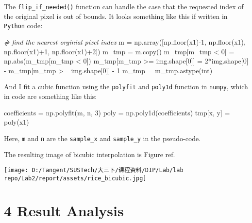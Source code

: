 \documentclass[
]{article}
\newenvironment{Shaded}{}{}
\newcommand{\BuiltInTok}[1]{\textcolor[rgb]{0.00,0.50,0.00}{#1}}
\newcommand{\CommentTok}[1]{\textcolor[rgb]{0.38,0.63,0.69}{\textit{#1}}}
\newcommand{\DecValTok}[1]{\textcolor[rgb]{0.25,0.63,0.44}{#1}}
\newcommand{\NormalTok}[1]{#1}
\newcommand{\OperatorTok}[1]{\textcolor[rgb]{0.40,0.40,0.40}{#1}}
\begin{document}
The \texttt{flip\_if\_needed()} function can handle the case that the
requested index of the original pixel is out of bounds. It looks
something like this if written in \texttt{Python} code:

\begin{Shaded}
\begin{Highlighting}[]
\CommentTok{\# find the nearest orginial pixel index}
\NormalTok{m }\OperatorTok{=}\NormalTok{ np.array([np.floor(x1)}\OperatorTok{{-}}\DecValTok{1}\NormalTok{, np.floor(x1), np.floor(x1)}\OperatorTok{+}\DecValTok{1}\NormalTok{, np.floor(x1)}\OperatorTok{+}\DecValTok{2}\NormalTok{])}
\NormalTok{m\_tmp }\OperatorTok{=}\NormalTok{ m.copy()}
\NormalTok{m\_tmp[m\_tmp }\OperatorTok{\textless{}} \DecValTok{0}\NormalTok{] }\OperatorTok{=}\NormalTok{ np.}\BuiltInTok{abs}\NormalTok{(m\_tmp[m\_tmp }\OperatorTok{\textless{}} \DecValTok{0}\NormalTok{])}
\NormalTok{m\_tmp[m\_tmp }\OperatorTok{\textgreater{}=}\NormalTok{ img.shape[}\DecValTok{0}\NormalTok{]] }\OperatorTok{=} \DecValTok{2}\OperatorTok{*}\NormalTok{img.shape[}\DecValTok{0}\NormalTok{] }\OperatorTok{{-}}\NormalTok{ m\_tmp[m\_tmp }\OperatorTok{\textgreater{}=}\NormalTok{ img.shape[}\DecValTok{0}\NormalTok{]] }\OperatorTok{{-}} \DecValTok{1}
\NormalTok{m\_tmp }\OperatorTok{=}\NormalTok{ m\_tmp.astype(}\BuiltInTok{int}\NormalTok{)}
\end{Highlighting}
\end{Shaded}

And I fit a cubic function using the \texttt{polyfit} and
\texttt{poly1d} function in \texttt{numpy}, which in code are something
like this:

\begin{Shaded}
\begin{Highlighting}[]
\NormalTok{coefficients }\OperatorTok{=}\NormalTok{ np.polyfit(m, n, }\DecValTok{3}\NormalTok{)}
\NormalTok{poly }\OperatorTok{=}\NormalTok{ np.poly1d(coefficients)}
\NormalTok{tmp[x, y] }\OperatorTok{=}\NormalTok{ poly(x1)}
\end{Highlighting}
\end{Shaded}

Here, \texttt{m} and \texttt{n} are the \texttt{sample\_x} and
\texttt{sample\_y} in the pseudo-code.

The resulting image of bicubic interpolation is Figure ref.

\texttt{[image: D:/Tangent/SUSTech/大三下/课程资料/DIP/Lab/lab repo/Lab2/report/assets/rice\_bicubic.jpg]}

\hypertarget{4-result-analysis}{%
\section{4 Result Analysis}\label{4-result-analysis}}
\end{document}
